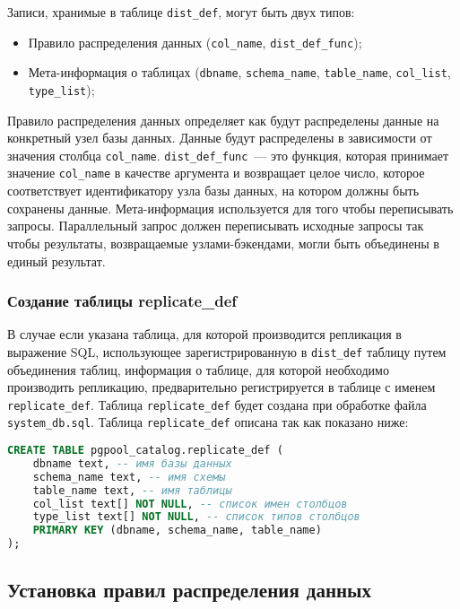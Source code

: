 Записи, хранимые в таблице \lstinline!dist_def!, могут быть двух типов:

\begin{itemize}
  \item Правило распределения данных (\lstinline!col_name!, \lstinline!dist_def_func!);
  \item Мета-информация о таблицах (\lstinline!dbname!, \lstinline!schema_name!, \lstinline!table_name!, \lstinline!col_list!, \lstinline!type_list!);
\end{itemize}

Правило распределения данных определяет как будут распределены данные на конкретный узел базы данных. Данные будут распределены в зависимости от значения столбца \lstinline!col_name!. \lstinline!dist_def_func!~--- это функция, которая принимает значение \lstinline!col_name! в качестве аргумента и возвращает целое число, которое соответствует идентификатору узла базы данных, на котором должны быть сохранены данные. Мета-информация используется для того чтобы переписывать запросы. Параллельный запрос должен переписывать исходные запросы так чтобы результаты, возвращаемые узлами-бэкендами, могли быть объединены в единый результат.


\subsubsection{Создание таблицы replicate\_def}

В случае если указана таблица, для которой производится репликация в выражение SQL, использующее зарегистрированную в \lstinline!dist_def! таблицу путем объединения таблиц, информация о таблице, для которой необходимо производить репликацию, предварительно регистрируется в таблице с именем \lstinline!replicate_def!. Таблица \lstinline!replicate_def! будет создана при обработке файла \lstinline!system_db.sql!. Таблица \lstinline!replicate_def! описана так как показано ниже:

\begin{lstlisting}[language=SQL,label=lst:pgpool31:1,caption=Создание таблицы replicate\_def]
CREATE TABLE pgpool_catalog.replicate_def (
    dbname text, -- имя базы данных
    schema_name text, -- имя схемы
    table_name text, -- имя таблицы
    col_list text[] NOT NULL, -- список имен столбцов
    type_list text[] NOT NULL, -- список типов столбцов
    PRIMARY KEY (dbname, schema_name, table_name)
);
\end{lstlisting}


\subsection{Установка правил распределения данных}

